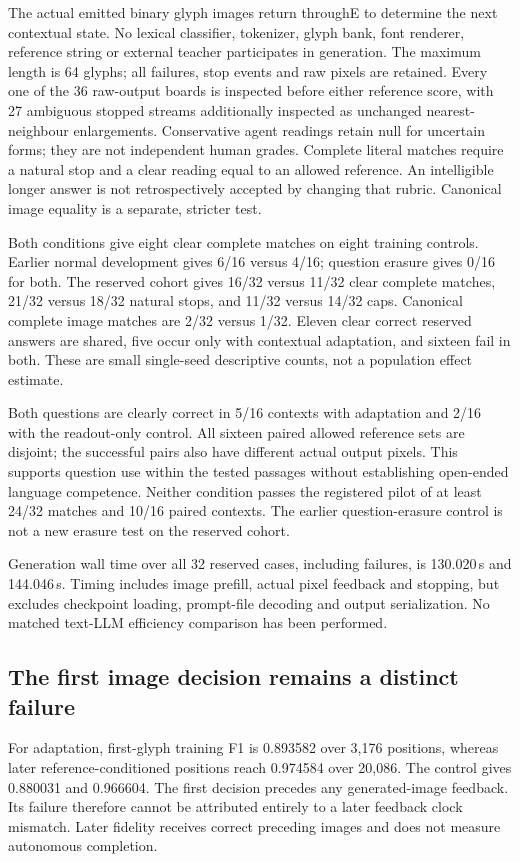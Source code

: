 \documentclass[10pt,a4paper]{article}
\providecommand{\DIFadd}[1]{{\protect\color{blue} \sf #1}} %
\begin{document}
\DIFadd{The actual emitted binary glyph images return throughE to determine the next
contextual state. No lexical classifier, tokenizer, glyph bank, font renderer,
reference string or external teacher participates in generation. The maximum
length is 64 glyphs; all failures, stop events and raw pixels are retained.
Every one of the 36 raw-output boards is inspected before either reference
score, with 27 ambiguous stopped streams additionally inspected as unchanged
nearest-neighbour enlargements. Conservative agent readings retain null for
uncertain forms; they are not independent human grades. Complete literal
matches require a natural stop and a clear reading equal to an allowed
reference. An intelligible longer answer is not retrospectively accepted by
changing that rubric. Canonical image equality is a separate, stricter test.
}

\DIFadd{Both conditions give eight clear complete matches on eight training controls.
Earlier normal development gives 6/16 versus 4/16; question erasure gives 0/16
for both. The reserved cohort gives 16/32 versus 11/32 clear complete matches,
21/32 versus 18/32 natural stops, and 11/32 versus 14/32 caps. Canonical complete
image matches are 2/32 versus 1/32. Eleven clear correct reserved answers are
shared, five occur only with contextual adaptation, and sixteen fail in both.
These are small single-seed descriptive counts, not a population effect estimate.
}

\DIFadd{Both questions are clearly correct in 5/16 contexts with adaptation and 2/16
with the readout-only control. All sixteen paired allowed reference sets are
disjoint; the successful pairs also have different actual output pixels.
This supports question use within the tested passages without establishing
open-ended language competence. Neither condition passes the registered pilot
of at least 24/32 matches and 10/16 paired contexts. The earlier question-erasure
control is not a new erasure test on the reserved cohort.
}

\DIFadd{Generation wall time over all 32 reserved cases, including failures, is
130.020\,s and 144.046\,s. Timing includes image prefill, actual pixel feedback
and stopping, but excludes checkpoint loading, prompt-file decoding and output
serialization. No matched text-LLM efficiency comparison has been performed.
}

\subsection*{\DIFadd{The first image decision remains a distinct failure}}
\DIFadd{For adaptation, first-glyph training F1 is 0.893582 over 3,176 positions, whereas
later reference-conditioned positions reach 0.974584 over 20,086. The control
gives 0.880031 and 0.966604. The first decision precedes any generated-image
feedback. Its failure therefore cannot be attributed entirely to a later
feedback clock mismatch. Later fidelity receives correct preceding images
and does not measure autonomous completion.
}
\end{document}
